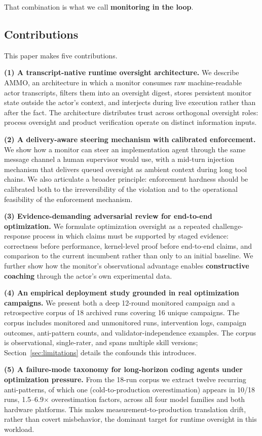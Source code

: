 \documentclass[11pt]{article}
\begin{document}
That combination is what we call \textbf{monitoring in the loop}.

\subsection{Contributions}

This paper makes five contributions.

\textbf{(1) A transcript-native runtime oversight architecture.}
We describe AMMO, an architecture in which a monitor consumes raw machine-readable actor transcripts, filters them into an oversight digest, stores persistent monitor state outside the actor's context, and interjects during live execution rather than after the fact. The architecture distributes trust across orthogonal oversight roles: process oversight and product verification operate on distinct information inputs.

\textbf{(2) A delivery-aware steering mechanism with calibrated enforcement.}
We show how a monitor can steer an implementation agent through the same message channel a human supervisor would use, with a mid-turn injection mechanism that delivers queued oversight as ambient context during long tool chains. We also articulate a broader principle: enforcement hardness should be calibrated both to the irreversibility of the violation and to the operational feasibility of the enforcement mechanism.

\textbf{(3) Evidence-demanding adversarial review for end-to-end optimization.}
We formulate optimization oversight as a repeated challenge-response process in which claims must be supported by staged evidence: correctness before performance, kernel-level proof before end-to-end claims, and comparison to the current incumbent rather than only to an initial baseline. We further show how the monitor's observational advantage enables \textbf{constructive coaching} through the actor's own experimental data.

\textbf{(4) An empirical deployment study grounded in real optimization campaigns.}
We present both a deep 12-round monitored campaign and a retrospective corpus of 18 archived runs covering 16 unique campaigns. The corpus includes monitored and unmonitored runs, intervention logs, campaign outcomes, anti-pattern counts, and validator-independence examples. The corpus is observational, single-rater, and spans multiple skill versions; Section~\ref{sec:limitations} details the confounds this introduces.

\textbf{(5) A failure-mode taxonomy for long-horizon coding agents under optimization pressure.}
From the 18-run corpus we extract twelve recurring anti-patterns, of which one (cold-to-production overestimation) appears in 10/18 runs, 1.5--6.9$\times$ overestimation factors, across all four model families and both hardware platforms. This makes measurement-to-production translation drift, rather than covert misbehavior, the dominant target for runtime oversight in this workload.
\end{document}
